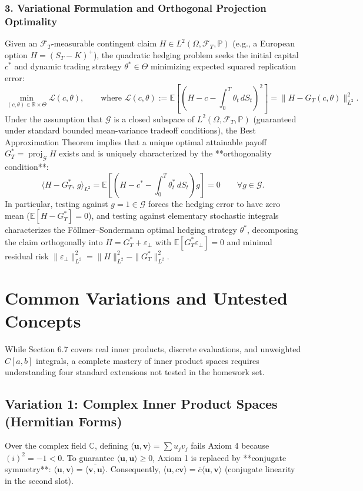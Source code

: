 \documentclass[11pt, letterpaper]{article}
\theoremstyle{definition}
\theoremstyle{remark}
\begin{document}
\subsubsection*{3. Variational Formulation and Orthogonal Projection Optimality}
Given an $\mathcal{F}_T$-measurable contingent claim $H \in L^2(\Omega, \mathcal{F}_T, \mathbb{P})$ (e.g., a European option $H = (S_T - K)^+$), the quadratic hedging problem seeks the initial capital $c^*$ and dynamic trading strategy $\theta^* \in \Theta$ minimizing expected squared replication error:
\[
    \min_{(c, \theta) \in \mathbb{R} \times \Theta} \mathcal{L}(c, \theta), \qquad \text{where } \mathcal{L}(c, \theta) := \mathbb{E}\!\left[\left(H - c - \int_0^T \theta_t\,dS_t\right)^2\right] = \|H - G_T(c, \theta)\|_{L^2}^2.
\]
Under the assumption that $\mathcal{G}$ is a closed subspace of $L^2(\Omega, \mathcal{F}_T, \mathbb{P})$ (guaranteed under standard bounded mean-variance tradeoff conditions), the Best Approximation Theorem implies that a unique optimal attainable payoff $G_T^* = \operatorname{proj}_{\mathcal{G}} H$ exists and is uniquely characterized by the **orthogonality condition**:
\[
    \langle H - G_T^*, \, g \rangle_{L^2} = \mathbb{E}\!\left[\left(H - c^* - \int_0^T \theta_t^*\,dS_t\right) g\right] = 0 \qquad \forall g \in \mathcal{G}.
\]
In particular, testing against $g = 1 \in \mathcal{G}$ forces the hedging error to have zero mean ($\mathbb{E}[H - G_T^*] = 0$), and testing against elementary stochastic integrals characterizes the F\"{o}llmer--Sondermann optimal hedging strategy $\theta^*$, decomposing the claim orthogonally into $H = G_T^* + \varepsilon_{\perp}$ with $\mathbb{E}[G_T^* \varepsilon_{\perp}] = 0$ and minimal residual risk $\|\varepsilon_{\perp}\|_{L^2}^2 = \|H\|_{L^2}^2 - \|G_T^*\|_{L^2}^2$.

\newpage
\section{Common Variations and Untested Concepts}

While Section 6.7 covers real inner products, discrete evaluations, and unweighted $C[a, b]$ integrals, a complete mastery of inner product spaces requires understanding four standard extensions not tested in the homework set.

\subsection{Variation 1: Complex Inner Product Spaces (Hermitian Forms)}
Over the complex field $\mathbb{C}$, defining $\langle \mathbf{u}, \mathbf{v} \rangle = \sum u_j v_j$ fails Axiom 4 because $(i)^2 = -1 < 0$. To guarantee $\langle \mathbf{u}, \mathbf{u} \rangle \ge 0$, Axiom 1 is replaced by **conjugate symmetry**: $\langle \mathbf{u}, \mathbf{v} \rangle = \overline{\langle \mathbf{v}, \mathbf{u} \rangle}$. Consequently, $\langle \mathbf{u}, c\mathbf{v} \rangle = \overline{c}\langle \mathbf{u}, \mathbf{v} \rangle$ (conjugate linearity in the second slot).
\end{document}
